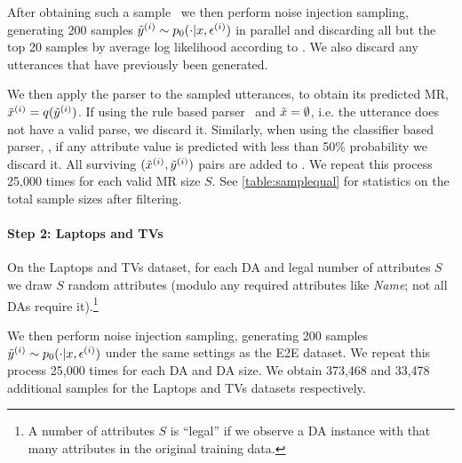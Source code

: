 After obtaining such a sample \mrx~we then perform noise injection sampling,
generating 200 samples $\tilde{y}^{(i)} \sim 
p_0(\cdot|x, \epsilon^{(i)})$ 
in parallel and discarding all but the top 20
samples by average log likelihood according to \basegen.
We also discard any utterances that have previously been generated.

We then apply the parser to the sampled utterances, to obtain its
predicted MR, $\tilde{x}^{(i)} = q(\tilde{y}^{(i)})$. If using 
the rule based parser ~and $\tilde{x} = \emptyset$, i.e. the utterance
does not have a valid parse, we discard it.
Similarly, when using the classifier based parser, \learnedclf, if 
any attribute value is predicted with less than 50\% probability we discard 
it. All surviving $(\tilde{x}^{(i)}, \tilde{y}^{(i)})$ pairs are added to \augdata.
We repeat this process 25,000 times for each valid MR size $S$.
See \autoref{table:samplequal} for statistics on the total sample sizes 
after filtering.

\paragraph{Step 2: Laptops and TVs} On the Laptops and TVs dataset,
for each DA and legal number of attributes $S$ we draw $S$ random attributes
(modulo any required attributes like \textit{Name}; not all DAs require it).\footnote{A number of attributes $S$ is ``legal'' if we observe a DA instance with that 
many attributes in the original training data.}

We then perform noise injection sampling,
generating 200 samples $\tilde{y}^{(i)} \sim 
p_0(\cdot|x, \epsilon^{(i)})$ under the same settings as the E2E
dataset. We repeat this process 25,000 times for each DA and DA size.
We obtain 373,468 and 33,478 additional samples for the Laptops 
and TVs datasets respectively.

